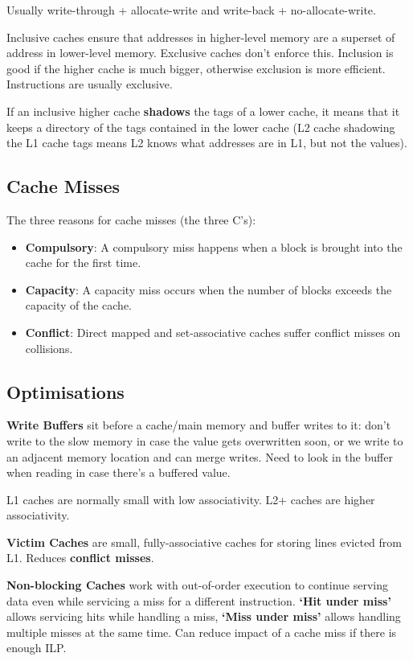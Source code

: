 \documentclass[a4paper, 11pt]{article}
\begin{document}
{{        Usually write-through + allocate-write and write-back + no-allocate-write.

        Inclusive caches ensure that addresses in higher-level memory are a superset of address in lower-level memory. Exclusive caches don't enforce this. Inclusion is good if the higher cache is much bigger, otherwise exclusion is more efficient. Instructions are usually exclusive.

        If an inclusive higher cache \textbf{shadows} the tags of a lower cache, it means that it keeps a directory of the tags contained in the lower cache (L2 cache shadowing the L1 cache tags means L2 knows what addresses are in L1, but not the values).
    }
    \subsection*{Cache Misses}
    {
        The three reasons for cache misses (the three C's):

        \begin{itemize}
        \item \textbf{Compulsory}: A compulsory miss happens when a block is brought into the cache for the first time.
        \item \textbf{Capacity}: A capacity miss occurs when the number of blocks exceeds the capacity of the cache.
        \item \textbf{Conflict}: Direct mapped and set-associative caches suffer conflict misses on collisions.
        \end{itemize}
    }
    \subsection*{Optimisations}
    {
        \textbf{Write Buffers} sit before a cache/main memory and buffer writes to it: don't write to the slow memory in case the value gets overwritten soon, or we write to an adjacent memory location and can merge writes. Need to look in the buffer when reading in case there's a buffered value.

        L1 caches are normally small with low associativity. L2+ caches are higher associativity.

        \textbf{Victim Caches} are small, fully-associative caches for storing lines evicted from L1. Reduces \textbf{conflict misses}.

        \textbf{Non-blocking Caches} work with out-of-order execution to continue serving data even while servicing a miss for a different instruction. \textbf{`Hit under miss'} allows servicing hits while handling a miss, \textbf{`Miss under miss'} allows handling multiple misses at the same time. Can reduce impact of a cache miss if there is enough ILP.

}}
\end{document}

